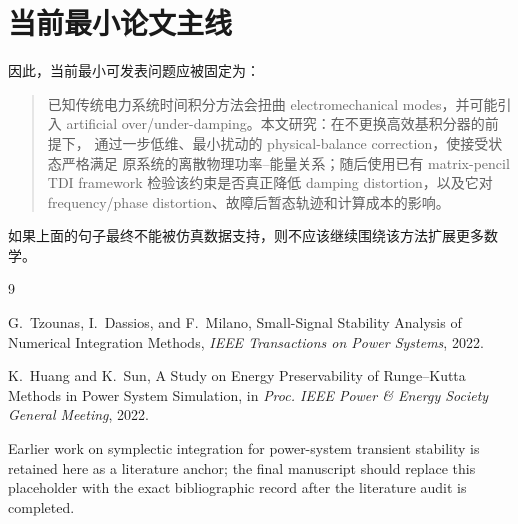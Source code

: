 \documentclass[UTF8,11pt,a4paper]{ctexart}
\begin{document}
\section{当前最小论文主线}

因此，当前最小可发表问题应被固定为：

\begin{quote}
已知传统电力系统时间积分方法会扭曲 electromechanical modes，并可能引入
artificial over/under-damping。本文研究：在不更换高效基积分器的前提下，
通过一步低维、最小扰动的 physical-balance correction，使接受状态严格满足
原系统的离散物理功率--能量关系；随后使用已有 matrix-pencil TDI framework
检验该约束是否真正降低 damping distortion，以及它对 frequency/phase
distortion、故障后暂态轨迹和计算成本的影响。
\end{quote}

如果上面的句子最终不能被仿真数据支持，则不应该继续围绕该方法扩展更多数学。

\begin{thebibliography}{9}

G.~Tzounas, I.~Dassios, and F.~Milano,
Small-Signal Stability Analysis of Numerical Integration Methods,
\emph{IEEE Transactions on Power Systems}, 2022.

K.~Huang and K.~Sun,
A Study on Energy Preservability of Runge--Kutta Methods in Power System Simulation,
in \emph{Proc. IEEE Power \& Energy Society General Meeting}, 2022.

Earlier work on symplectic integration for power-system transient stability
is retained here as a literature anchor; the final manuscript should replace
this placeholder with the exact bibliographic record after the literature
audit is completed.

\end{thebibliography}
\end{document}
